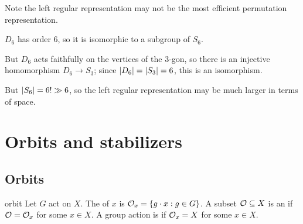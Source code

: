 \documentclass[12pt,letterpaper]{report}
\begin{document}
Note the left regular representation may not be the most efficient permutation representation.

\begin{ex}
  $D_6$ has order 6, so it is isomorphic to a subgroup of $S_6$.

  But $D_6$ acts faithfully on the vertices of the 3-gon, so there is an injective homomorphism
  $D_6 \to S_3$; since $\lvert D_6\rvert = \lvert S_3\rvert = 6$, this is an isomorphism.

  But $\lvert S_6\rvert = 6! \gg 6$, so the left regular representation may be much larger in terms of
  space.
\end{ex}

\section{Orbits and stabilizers}

\subsection{Orbits}

\begin{defn}{orbit}{}
  Let $G$ act on $X$.
  The  of $x$ is $\mathcal{O}_x = \{g \cdot x : g \in G\}$.
  A subset $\mathcal{O} \subseteq X$ is an  if $\mathcal{O} = \mathcal{O}_x$ for some $x \in X$.
  A group action is  if $\mathcal{O}_x = X$ for some $x \in X$.
\end{defn}
\end{document}
